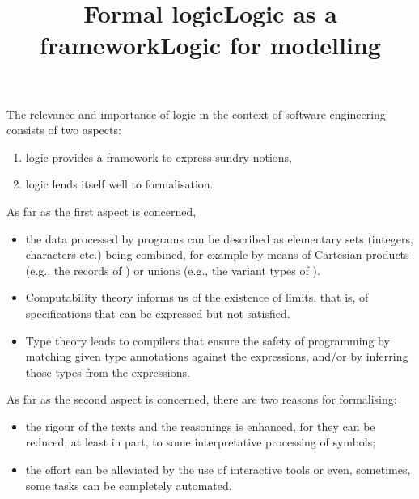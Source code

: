 \documentclass[wide]{slides}
\begin{document}
\maketitle


\begin{slide}
  \title{Formal logic}

  The relevance and importance of logic in the context of software
  engineering consists of two aspects:
  \begin{enumerate}

    \item logic provides a framework to express sundry notions,

    \item logic lends itself well to formalisation.

  \end{enumerate}

\end{slide}

\begin{slide}
  \title{Logic as a framework}

  As far as the first aspect is concerned,
  \begin{itemize}

    \item the data processed by programs can be described as
      elementary sets (integers, characters etc.) being combined, for
      example by means of Cartesian products (e.g., the records of
      \OCaml) or unions (e.g., the variant types of
      \OCaml).

    \item Computability theory informs us of the existence of limits,
      that is, of specifications that can be expressed but not
      satisfied.

    \item Type theory leads to compilers that ensure the safety of
      programming by matching given type annotations against the
      expressions, and/or by inferring those types from the
      expressions.

  \end{itemize}

\end{slide}

\begin{slide}
  \title{Logic for modelling}

  As far as the second aspect is concerned, there are two reasons for
  formalising:
  \begin{itemize}

    \item the rigour of the texts and the reasonings is enhanced, for
      they can be reduced, at least in part, to some interpretative
      processing of symbols;

    \item the effort can be alleviated by the use of interactive tools
      or even, sometimes, some tasks can be completely automated.
  \end{itemize}

\end{slide}
\end{document}
